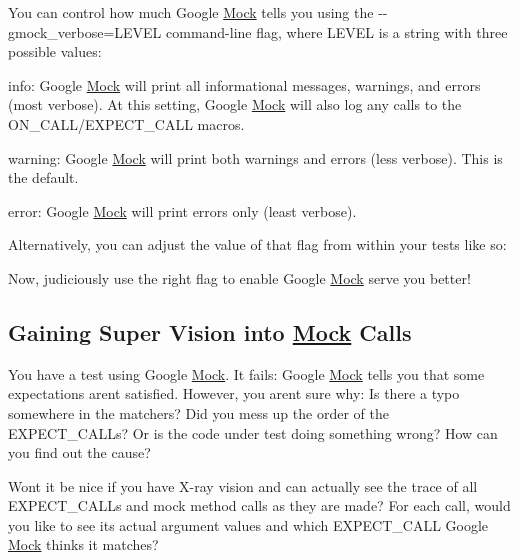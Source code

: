You can control how much Google \mbox{\hyperlink{classMock}{Mock}} tells you using the {\ttfamily -\/-\/gmock\+\_\+verbose=L\+E\+V\+EL} command-\/line flag, where {\ttfamily L\+E\+V\+EL} is a string with three possible values\+:


\begin{DoxyItemize}
\item {\ttfamily info}\+: Google \mbox{\hyperlink{classMock}{Mock}} will print all informational messages, warnings, and errors (most verbose). At this setting, Google \mbox{\hyperlink{classMock}{Mock}} will also log any calls to the {\ttfamily O\+N\+\_\+\+C\+A\+L\+L/\+E\+X\+P\+E\+C\+T\+\_\+\+C\+A\+LL} macros.
\item {\ttfamily warning}\+: Google \mbox{\hyperlink{classMock}{Mock}} will print both warnings and errors (less verbose). This is the default.
\item {\ttfamily error}\+: Google \mbox{\hyperlink{classMock}{Mock}} will print errors only (least verbose).
\end{DoxyItemize}

Alternatively, you can adjust the value of that flag from within your tests like so\+:


\begin{DoxyCode}{0}
\end{DoxyCode}


Now, judiciously use the right flag to enable Google \mbox{\hyperlink{classMock}{Mock}} serve you better!

\subsection*{Gaining Super Vision into \mbox{\hyperlink{classMock}{Mock}} Calls}

You have a test using Google \mbox{\hyperlink{classMock}{Mock}}. It fails\+: Google \mbox{\hyperlink{classMock}{Mock}} tells you that some expectations aren\textquotesingle{}t satisfied. However, you aren\textquotesingle{}t sure why\+: Is there a typo somewhere in the matchers? Did you mess up the order of the {\ttfamily E\+X\+P\+E\+C\+T\+\_\+\+C\+A\+LL}s? Or is the code under test doing something wrong? How can you find out the cause?

Won\textquotesingle{}t it be nice if you have X-\/ray vision and can actually see the trace of all {\ttfamily E\+X\+P\+E\+C\+T\+\_\+\+C\+A\+LL}s and mock method calls as they are made? For each call, would you like to see its actual argument values and which {\ttfamily E\+X\+P\+E\+C\+T\+\_\+\+C\+A\+LL} Google \mbox{\hyperlink{classMock}{Mock}} thinks it matches?

